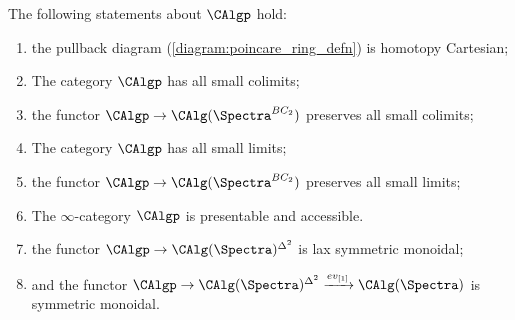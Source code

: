 \begin{theorem}\label{thm:poincare_rings_cat_formal_properties}
The following statements about $\CAlgp$ hold:
\begin{enumerate}[label=(\arabic*)]
\item \label{thmitem:defining_diagram_homotopy_pullback} the pullback diagram (\ref{diagram:poincare_ring_defn}) is homotopy Cartesian; %
\item \label{thmitem:poincare_ring_has_colimits} The category $\CAlgp$ has all small colimits;
\item \label{thmitem:poincare_ring_to_ring_preserves_colims} the functor $ \CAlgp \to \CAlg(\Spectra^{BC_2})$ preserves all small colimits;
\item \label{thmitem:poincare_ring_has_limits} The category $\CAlgp$ has all small limits;
\item \label{thmitem:poincare_ring_to_ring_preserves_lims} the functor $ \CAlgp \to \CAlg(\Spectra^{BC_2})$ preserves all small limits;
\item \label{thmitem:poincare_rings_presentable_accessible} The $ \infty $-category $ \CAlgp $ is presentable and accessible. 
\item the functor $ \CAlgp\to \CAlg(\Spectra)^{\Delta^2}$ is lax symmetric monoidal;
\item and the functor $ \CAlgp\to \CAlg(\Spectra)^{\Delta^2}\xrightarrow{ev_{[1]}} \CAlg(\Spectra)$ is symmetric monoidal.
\end{enumerate}
\end{theorem}

